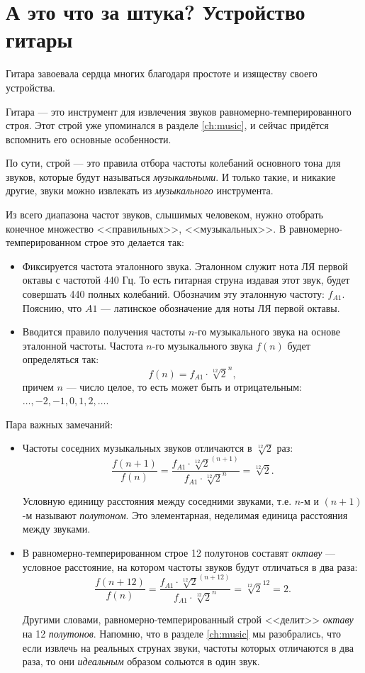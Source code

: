 \chapter{А это что за штука? Устройство гитары}
\label{ch:guitar}

Гитара завоевала сердца многих благодаря простоте и изяществу своего устройства.

Гитара --- это инструмент для извлечения звуков равномерно-темперированного строя. Этот строй уже упоминался в разделе \ref{ch:music}, и сейчас придётся вспомнить его основные особенности.

По сути, строй --- это правила отбора частоты колебаний основного тона для звуков, которые будут называться \emph{музыкальными}. И только такие, и никакие другие, звуки можно извлекать из \emph{музыкального} инструмента.

Из всего диапазона частот звуков, слышимых человеком, нужно отобрать конечное множество <<правильных>>, <<музыкальных>>. В равномерно-темперированном строе это делается так:
\begin{itemize}
    \item Фиксируется частота эталонного звука. Эталонном служит нота ЛЯ первой октавы с частотой 440 Гц. То есть гитарная струна издавая этот звук, будет совершать 440 полных колебаний. Обозначим эту эталонную частоту: $f_{A1}$. Пояснию, что $A1$ --- латинское обозначение для ноты ЛЯ первой октавы.
    
    \item Вводится правило получения частоты $n$-го музыкального звука на основе эталонной частоты. Частота $n$-го музыкального звука $f(n)$ будет определяться так: 
    \[
        f(n) = f_{A1}\cdot{\sqrt[12]{2}}^n,
    \]
    причем $n$ --- число целое, то есть может быть и отрицательным: $\ldots, -2, -1, 0, 1, 2, \ldots$.
\end{itemize}

Пара важных замечаний:
\begin{itemize}
    \item Частоты соседних музыкальных звуков отличаются в $\sqrt[12]{2}$ раз:
    \[
        \frac{f(n+1)}{f(n)} = \frac{f_{A1}\cdot{\sqrt[12]{2}}^(n+1)}{f_{A1}\cdot{\sqrt[12]{2}}^n} = \sqrt[12]{2}.
    \]

    Условную единицу расстояния между соседними звуками, т.е. $n$-м и $(n+1)$-м называют \emph{полутоном}. Это элементарная, неделимая единица расстояния между звуками. 

    \item В равномерно-темперированном строе 12 полутонов составят \emph{октаву} --- условное расстояние, на котором частоты звуков будут отличаться в два раза:
    \[
        \frac{f(n+12)}{f(n)} = \frac{f_{A1}\cdot{\sqrt[12]{2}}^(n+12)}{f_{A1}\cdot{\sqrt[12]{2}}^n} = {\sqrt[12]{2}}^12 = 2.
    \]
    
    Другими словами, равномерно-темперированный строй <<делит>> \emph{октаву} на 12 \emph{полутонов}. Напомню, что в разделе \ref{ch:music} мы разобрались, что если извлечь на реальных струнах звуки, частоты которых отличаются в два раза, то они \emph{идеальным} образом сольются в один звук.
\end{itemize}

